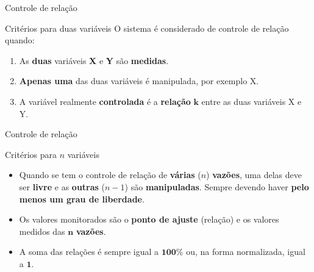 \begin{frame}{Controle de relação}
	\begin{block}{Critérios para duas variáveis}
		O sistema é considerado de controle de relação quando:
		\begin{enumerate}
			\item As \textbf{duas} variáveis \textbf{X} e \textbf{Y} são \textbf{medidas}.
			\item \textbf{Apenas uma} das duas variáveis é manipulada, por exemplo X.
			\item A variável realmente \textbf{controlada} é a \textbf{relação} $ \bm{k} $ entre as duas variáveis X e Y.
		\end{enumerate}
	\end{block}
\end{frame}


%	
%	
%	


\begin{frame}{Controle de relação}
	\begin{block}{Critérios para $ n $ variáveis}
		\begin{itemize}
			\item Quando se tem o controle de relação de \textbf{várias} ($ n $) \textbf{vazões}, uma delas deve ser \textbf{livre} e as \textbf{outras} ($ n-1 $) são \textbf{manipuladas}. Sempre devendo haver \textbf{pelo menos um grau de liberdade}.
			\item Os valores monitorados são o \textbf{ponto de ajuste} (relação) e os valores medidos das $ \bm{n} $ \textbf{vazões}.
			\item A soma das relações é sempre igual a $ \bm{100\%} $ ou, na forma normalizada, igual a $ \bm{1} $.
		\end{itemize}
	\end{block}
\end{frame}


